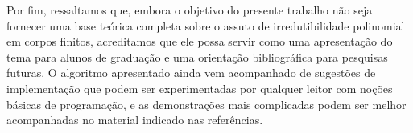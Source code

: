 Por fim, ressaltamos que, embora o objetivo do presente trabalho não
seja fornecer uma base teórica completa sobre o assuto de
irredutibilidade polinomial em corpos finitos, acreditamos que ele possa
servir como uma apresentação do tema para alunos de graduação
e uma orientação bibliográfica para
pesquisas futuras. O algoritmo apresentado ainda vem
acompanhado de sugestões de implementação que podem ser experimentadas
por qualquer leitor com noções básicas de programação, e as
demonstrações mais complicadas podem ser melhor acompanhadas no material
indicado nas referências.

